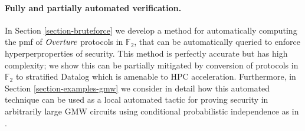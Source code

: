 \paragraph{Fully and partially automated verification.} In Section
\ref{section-bruteforce} we develop a method for automatically
computing the pmf of $\mathit{Overture}$ protocols in $\mathbb{F}_2$, that can
be automatically queried to enforce hyperperproperties of
security. This method is perfectly accurate but has high complexity;
we show this can be partially mitigated by conversion of protocols in
$\mathbb{F}_2$ to stratified Datalog which is amenable to HPC
acceleration. Furthermore, in Section \ref{section-examples-gmw} we
consider in detail how this automated technique can be used as a local
automated tactic for proving security in arbitrarily large GMW
circuits using conditional probabilistic independence as in
\cite{XXX}.
